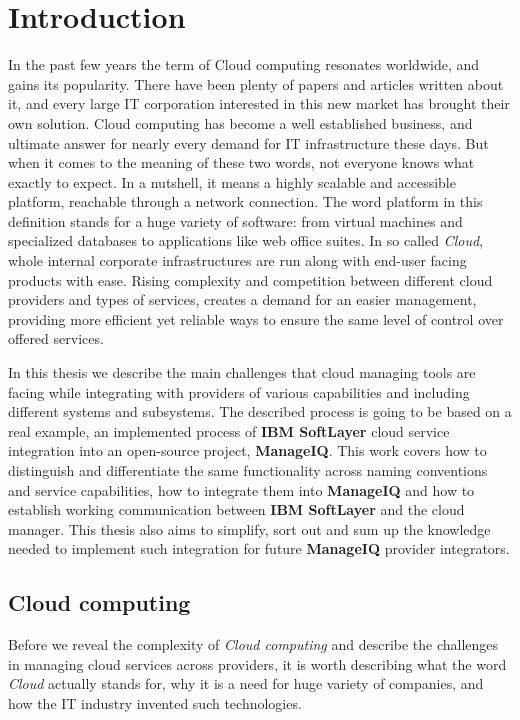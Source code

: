 
\chapter{Introduction}
\label{chap:Introduction}
In the past few years the term of Cloud computing resonates worldwide, and gains its popularity. There have been plenty of papers and articles written about it, and every large IT corporation interested in this new market has brought their own solution. Cloud computing has become a well established business, and ultimate answer for nearly every demand for IT infrastructure these days. But when it comes to the meaning of these two words, not everyone knows what exactly to expect. In a nutshell, it means a highly scalable and accessible platform, reachable through a network connection. The word platform in this definition stands for a huge variety of software: from virtual machines and specialized databases to applications like web office suites. In so called \emph{Cloud}, whole internal corporate infrastructures are run along with end-user facing products with ease. Rising complexity and competition between different cloud providers and types of services, creates a demand for an easier management, providing more efficient yet reliable ways to ensure the same level of control over offered services.

In this thesis we describe the main challenges that cloud managing tools are facing while integrating with providers of various capabilities and including different systems and subsystems. The described process is going to be based on a real example, an implemented process of \textbf{IBM SoftLayer} cloud service integration into an open-source project, \textbf{ManageIQ}. This work covers how to distinguish and differentiate the same functionality across naming conventions and service capabilities, how to integrate them into \textbf{ManageIQ} and how to establish working communication between \textbf{IBM SoftLayer} and the cloud manager. This thesis also aims to simplify, sort out and sum up the knowledge needed to implement such integration for future \textbf{ManageIQ} provider integrators.

\section{Cloud computing}
\label{sec:Cloud computing}
Before we reveal the complexity of \emph{Cloud computing} and describe the challenges in managing cloud services across providers, it is worth describing what the word \emph{Cloud} actually stands for, why it is a need for huge variety of companies, and how the IT industry invented such technologies\cite{cervone}.

